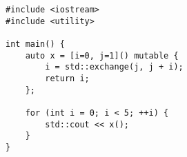 \begin{lstlisting}[title=\href{https://godbolt.org/z/e95d1x}{\texttt{godbolt.org/z/e95d1x}}]
#include <iostream>
#include <utility>

int main() {
    auto x = [i=0, j=1]() mutable {
        i = std::exchange(j, j + i);
        return i;
    };

    for (int i = 0; i < 5; ++i) {
        std::cout << x();
    }
}
\end{lstlisting}
